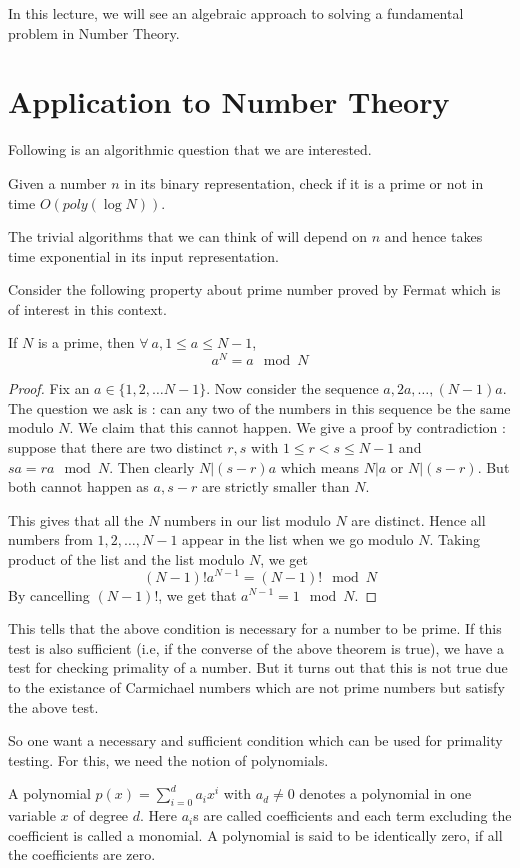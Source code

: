 In this lecture, we will see an algebraic approach to solving a fundamental
problem in Number Theory.
\section{Application to Number Theory}
Following is an algorithmic question that we are interested.
\begin{problem}
Given a number $n$ in its binary representation, check if it is a prime or not
in time $O(poly(\log N))$.
\end{problem}
\begin{note}
The trivial algorithms that we can think of will depend on $n$ and hence takes
time exponential in its input representation.
\end{note}

Consider the following property about prime number proved by Fermat which is
of interest in this context.
\begin{theorem} If $N$ is a prime, then $\forall~a, 1
	\le a \le N-1$, \[ a^N = a \mod N \]
\end{theorem}
\begin{proof}
	Fix an $a \in \{1,2,\ldots N-1\}$. Now consider the sequence $a, 2a,
	\ldots, (N-1)a$. The question we ask is : can any two of the numbers
	in this sequence be the same modulo $N$. We claim that this cannot
	happen. We give a proof by contradiction : suppose that there are two
	distinct $r,s$ with $1 \le r < s \le N-1$ and $sa = ra \mod N$. Then
	clearly $N | (s-r)a$ which means $N | a$ or $N | (s-r)$. But both
	cannot happen as $a, s-r$ are strictly smaller than $N$.

	This gives that all the $N$ numbers in our list modulo $N$ are
	distinct. Hence all numbers from $1,2,\ldots, N-1$ appear in the list
	when we go modulo $N$. Taking product of the list and the list modulo
	$N$, we get 
	\[ (N-1)! a^{N-1} = (N-1)! \mod N \]
	By cancelling $(N-1)!$, we get that $a^{N-1} = 1 \mod N$.
\end{proof}
This tells that the above condition is necessary for a number to be prime. If
this test is also sufficient (i.e, if the converse of the above theorem is
true), we have a test for checking primality of a number. But it turns out
that this is not true due to the existance of Carmichael numbers which are not
prime numbers but satisfy the above test.

So one want a necessary and sufficient condition which can be used for
primality testing. For this, we need the notion of polynomials.
\begin{definition}
	A polynomial $p(x) = \sum_{i=0}^d a_ix^i$ with $a_d \ne 0$ denotes a
	polynomial in one variable $x$ of degree $d$. Here $a_i$s are called
	coefficients and each term excluding the coefficient is called a
	monomial. A polynomial is said to be identically zero, if all the
	coefficients are zero.
\end{definition}

